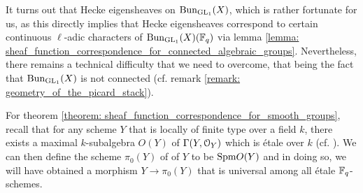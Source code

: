             It turns out that Hecke eigensheaves on $\mathrm{Bun}_{\operatorname{GL}_1}(X)$, which is rather fortunate for us, as this directly implies that Hecke eigensheaves correspond to certain continuous $\ell$-adic characters of $\mathrm{Bun}_{\operatorname{GL}_1}(X)(\mathbb{F}_q)$ via lemma \ref{lemma: sheaf_function_correspondence_for_connected_algebraic_groups}. Nevertheless, there remains a technical difficulty that we need to overcome, that being the fact that $\mathrm{Bun}_{\operatorname{GL}_1}(X)$ is not connected (cf. remark \ref{remark: geometry_of_the_picard_stack}).
            \begin{remark} \label{remark: the_connected_smooth_etale_short_exact_sequence}
                For theorem \ref{theorem: sheaf_function_correspondence_for_smooth_groups}, recall that for any scheme $Y$ that is locally of finite type over a field $k$, there exists a maximal $k$-subalgebra $O(Y)$ of $\Gamma(Y, \mathcal{O}_Y)$ which is \'etale over $k$ (cf. \cite[Proposition 5.44]{milne_algebraic_groups}). We can then define the scheme $\pi_0(Y)$ of  of $Y$ to be $\mathrm{Spm} O(Y)$ and in doing so, we will have obtained a morphism $Y \to \pi_0(Y)$ that is universal among all \'etale $\mathbb{F}_q$-schemes. 
                

\end{remark}
